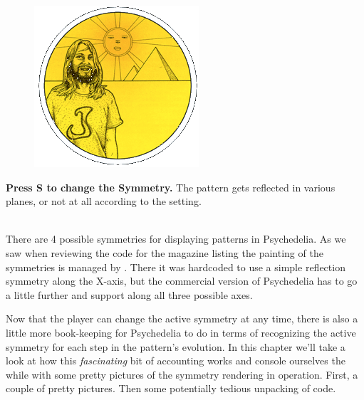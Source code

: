 \begin{definition}
\setlength{\intextsep}{0pt}%
\setlength{\columnsep}{3pt}%
\begin{figure}
\includegraphics[width=\linewidth]{src/callout/psych.png} 
\end{figure}
\small
\textbf{Press S to change the Symmetry.} The pattern gets reflected in various planes, or not at all according to the setting.
\\
\\
\end{definition}

There are 4 possible symmetries for displaying patterns in Psychedelia. As we saw when
reviewing the code for the magazine listing the painting of the symmetries is managed
by . There it was hardcoded to use a simple
reflection symmetry along the X-axis, but the commercial version of Psychedelia has to
go a little further and support along all three possible axes. 

Now that the player can change the active symmetry at any time, there is also a little more
book-keeping for Psychedelia to do in terms of recognizing the active symmetry for each
step in the pattern's evolution. In this chapter we'll take a look at how this 
\textit{fascinating} bit of accounting works and console ourselves the while with some
pretty pictures of the symmetry rendering in operation. First, a couple of pretty pictures.
Then some potentially tedious unpacking of code.

